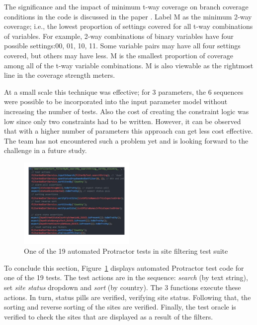\documentclass[conference]{IEEEtran}
\begin{document}
	The significance and the impact of minimum t-way coverage on branch coverage conditions in the code is discussed in the paper \cite{kuhn2016measuring}.
	Label M as the minimum 2-way coverage; i.e., the lowest proportion of settings covered for all t-way combinations of variables.
	For example, 2-way combinations of binary variables have four possible settings:00, 01, 10, 11.
	Some variable pairs may have all four settings covered, but others may have less.
	M is the smallest proportion of coverage among all of the t-way variable combinations.
	M is also viewable as the rightmost line in the coverage strength meters.

	At a small scale this technique was effective; for 3 parameters, the 6 sequences were possible to be incorporated into the input parameter model without increasing the number of tests. 
	Also the cost of creating the constraint logic was low since only two constraints had to be written.
	However, it can be observed that with a higher number of parameters this approach can get less cost effective. 
	The team has not encountered such a problem yet and is looking forward to the challenge in a future study.
	
	\begin{figure}[!h]
		\includegraphics[width=0.50\textwidth,]{sortingTestCode.pdf}
		\caption{One of the 19 automated Protractor tests in site filtering test suite}
		\label{fig:sortingTestCode}
	\end{figure}

	To conclude this section, Figure~\ref{fig:sortingTestCode} displays automated Protractor test code for one of the 19 tests.
	The test actions are in the sequence: \textit{search} (by text string), set \textit{site status} dropdown and \textit{sort} (by country). 
	The 3 functions execute these actions.
	In turn, status pills are verified, verifying site status.
	Following that, the sorting and reverse sorting of the sites are verified.
	Finally, the test oracle is verified to check the sites that are displayed as a result of the filters.
		
\end{document}

